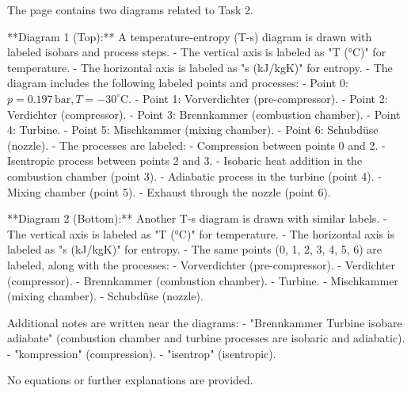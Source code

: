 The page contains two diagrams related to Task 2.  

**Diagram 1 (Top):**  
A temperature-entropy (T-s) diagram is drawn with labeled isobars and process steps.  
- The vertical axis is labeled as "T (°C)" for temperature.  
- The horizontal axis is labeled as "s (kJ/kgK)" for entropy.  
- The diagram includes the following labeled points and processes:  
  - Point 0: \( p = 0.197 \, \text{bar}, T = -30^\circ \text{C} \).  
  - Point 1: Vorverdichter (pre-compressor).  
  - Point 2: Verdichter (compressor).  
  - Point 3: Brennkammer (combustion chamber).  
  - Point 4: Turbine.  
  - Point 5: Mischkammer (mixing chamber).  
  - Point 6: Schubdüse (nozzle).  
- The processes are labeled:  
  - Compression between points 0 and 2.  
  - Isentropic process between points 2 and 3.  
  - Isobaric heat addition in the combustion chamber (point 3).  
  - Adiabatic process in the turbine (point 4).  
  - Mixing chamber (point 5).  
  - Exhaust through the nozzle (point 6).  

**Diagram 2 (Bottom):**  
Another T-s diagram is drawn with similar labels.  
- The vertical axis is labeled as "T (°C)" for temperature.  
- The horizontal axis is labeled as "s (kJ/kgK)" for entropy.  
- The same points (0, 1, 2, 3, 4, 5, 6) are labeled, along with the processes:  
  - Vorverdichter (pre-compressor).  
  - Verdichter (compressor).  
  - Brennkammer (combustion chamber).  
  - Turbine.  
  - Mischkammer (mixing chamber).  
  - Schubdüse (nozzle).  

Additional notes are written near the diagrams:  
- "Brennkammer Turbine isobare adiabate" (combustion chamber and turbine processes are isobaric and adiabatic).  
- "kompression" (compression).  
- "isentrop" (isentropic).  

No equations or further explanations are provided.